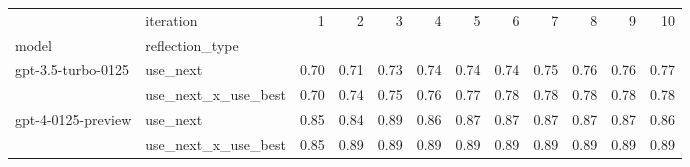 \begin{tabular}{llrrrrrrrrrr}
\toprule
 & iteration & 1 & 2 & 3 & 4 & 5 & 6 & 7 & 8 & 9 & 10 \\
model & reflection_type &  &  &  &  &  &  &  &  &  &  \\
\midrule
\multirow[t]{2}{*}{gpt-3.5-turbo-0125} & use_next & 0.70 & 0.71 & 0.73 & 0.74 & 0.74 & 0.74 & 0.75 & 0.76 & 0.76 & 0.77 \\
 & use_next_x_use_best & 0.70 & 0.74 & 0.75 & 0.76 & 0.77 & 0.78 & 0.78 & 0.78 & 0.78 & 0.78 \\
\cline{1-12}
\multirow[t]{2}{*}{gpt-4-0125-preview} & use_next & 0.85 & 0.84 & 0.89 & 0.86 & 0.87 & 0.87 & 0.87 & 0.87 & 0.87 & 0.86 \\
 & use_next_x_use_best & 0.85 & 0.89 & 0.89 & 0.89 & 0.89 & 0.89 & 0.89 & 0.89 & 0.89 & 0.89 \\
\cline{1-12}
\bottomrule
\end{tabular}
